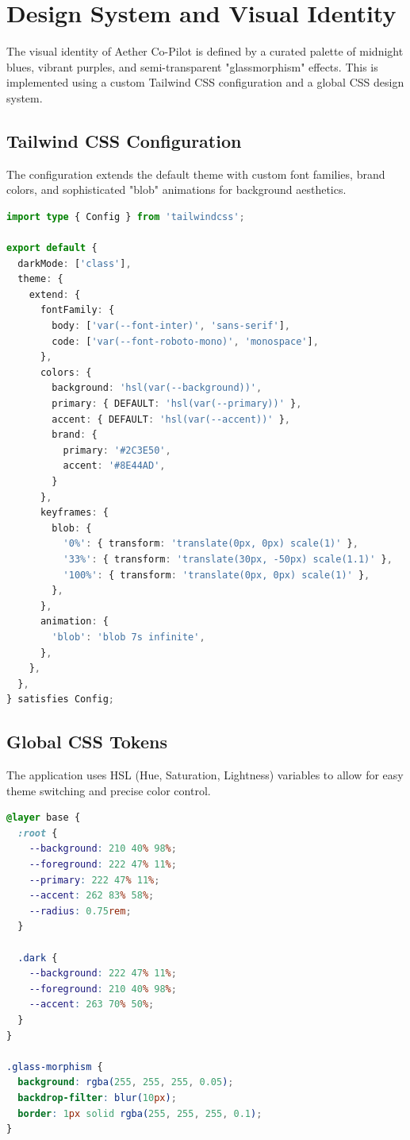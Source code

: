 \section{Design System and Visual Identity}

The visual identity of Aether Co-Pilot is defined by a curated palette of midnight blues, vibrant purples, and semi-transparent "glassmorphism" effects. This is implemented using a custom Tailwind CSS configuration and a global CSS design system.

\subsection{Tailwind CSS Configuration}
The configuration extends the default theme with custom font families, brand colors, and sophisticated "blob" animations for background aesthetics.

\begin{lstlisting}[language=TypeScript, caption=Tailwind Design Configuration (tailwind.config.ts)]
import type { Config } from 'tailwindcss';

export default {
  darkMode: ['class'],
  theme: {
    extend: {
      fontFamily: {
        body: ['var(--font-inter)', 'sans-serif'],
        code: ['var(--font-roboto-mono)', 'monospace'],
      },
      colors: {
        background: 'hsl(var(--background))',
        primary: { DEFAULT: 'hsl(var(--primary))' },
        accent: { DEFAULT: 'hsl(var(--accent))' },
        brand: {
          primary: '#2C3E50',
          accent: '#8E44AD',
        }
      },
      keyframes: {
        blob: {
          '0%': { transform: 'translate(0px, 0px) scale(1)' },
          '33%': { transform: 'translate(30px, -50px) scale(1.1)' },
          '100%': { transform: 'translate(0px, 0px) scale(1)' },
        },
      },
      animation: {
        'blob': 'blob 7s infinite',
      },
    },
  },
} satisfies Config;
\end{lstlisting}

\subsection{Global CSS Tokens}
The application uses HSL (Hue, Saturation, Lightness) variables to allow for easy theme switching and precise color control.

\begin{lstlisting}[language=CSS, caption=Global CSS Design Tokens (src/app/globals.css)]
@layer base {
  :root {
    --background: 210 40% 98%;
    --foreground: 222 47% 11%;
    --primary: 222 47% 11%;
    --accent: 262 83% 58%;
    --radius: 0.75rem;
  }

  .dark {
    --background: 222 47% 11%;
    --foreground: 210 40% 98%;
    --accent: 263 70% 50%;
  }
}

.glass-morphism {
  background: rgba(255, 255, 255, 0.05);
  backdrop-filter: blur(10px);
  border: 1px solid rgba(255, 255, 255, 0.1);
}
\end{lstlisting}

